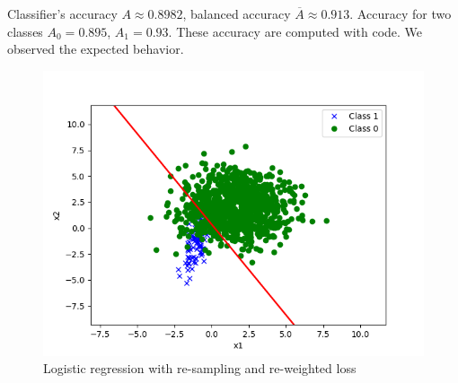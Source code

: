 \begin{answer}
    Classifier's accuracy $A \approx 0.8982$, balanced accuracy $\overline{A} \approx 0.913$.
    Accuracy for two classes $A_0 = 0.895$, $A_1 = 0.93$. These accuracy are computed with code.
    We observed the expected behavior.
    \begin{figure}[H]
        \centering
        \includegraphics[width=\textwidth]{../src/imbalanced/upsampling.png}
        \caption{Logistic regression with re-sampling and re-weighted loss}
        \label{fig:coding-sol}
    \end{figure}
\end{answer}